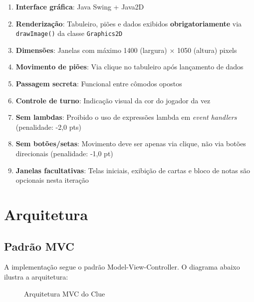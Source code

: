\documentclass[12pt,a4paper]{report}
\begin{document}
\begin{enumerate}
    \item \textbf{Interface gráfica}: Java Swing + Java2D
    \item \textbf{Renderização}: Tabuleiro, piões e dados exibidos \textbf{obrigatoriamente} via \texttt{drawImage()} da classe \texttt{Graphics2D}
    \item \textbf{Dimensões}: Janelas com máximo 1400 (largura) × 1050 (altura) pixels
    \item \textbf{Movimento de piões}: Via clique no tabuleiro após lançamento de dados
    \item \textbf{Passagem secreta}: Funcional entre cômodos opostos
    \item \textbf{Controle de turno}: Indicação visual da cor do jogador da vez
    \item \textbf{Sem lambdas}: Proibido o uso de expressões lambda em \textit{event handlers} (penalidade: -2,0 pts)
    \item \textbf{Sem botões/setas}: Movimento deve ser apenas via clique, não via botões direcionais (penalidade: -1,0 pt)
    \item \textbf{Janelas facultativas}: Telas iniciais, exibição de cartas e bloco de notas são opcionais nesta iteração
\end{enumerate}

\chapter{Arquitetura}

\section{Padrão MVC}

A implementação segue o padrão Model-View-Controller. O diagrama abaixo ilustra a arquitetura:

\begin{figure}[H]
\centering
{}
\caption{Arquitetura MVC do Clue}
\label{fig:mvc}
\end{figure}
\end{document}
